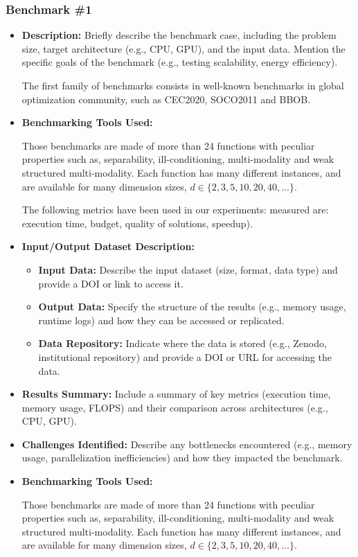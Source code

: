 \subsubsection{Benchmark \#1}
\begin{itemize}
\item \textbf{Description:} Briefly describe the benchmark case, including the problem size, target architecture (e.g., CPU, GPU), and the input data. Mention the specific goals of the benchmark (e.g., testing scalability, energy efficiency).

The first family of benchmarks consists in well-known benchmarks in global optimization community, such as CEC2020, SOCO2011 and BBOB.

\item \textbf{Benchmarking Tools Used:} 

Those benchmarks are made of more than 24 functions with peculiar properties such as, separability, ill-conditioning, multi-modality and weak structured multi-modality. Each function has many different instances, and are available for many dimension sizes, $d \in  \{ 2,3,5,10,20,40, ... \}$. 

The following metrics have been used in our experiments:  measured are: execution time, budget, quality of solutions, speedup).

\item \textbf{Input/Output Dataset Description:}
\begin{itemize}

\item \textbf{Input Data:} Describe the input dataset (size, format, data type) and provide a DOI or link to access it.

\item \textbf{Output Data:} Specify the structure of the results (e.g., memory usage, runtime logs) and how they can be accessed or replicated.

\item \textbf{Data Repository:} Indicate where the data is stored (e.g., Zenodo, institutional repository) and provide a DOI or URL for accessing the data.
\end{itemize}

\item \textbf{Results Summary:} Include a summary of key metrics (execution time, memory usage, FLOPS) and their comparison across architectures (e.g., CPU, GPU).

\item \textbf{Challenges Identified:} Describe any bottlenecks encountered (e.g., memory usage, parallelization inefficiencies) and how they impacted the benchmark.


\item \textbf{Benchmarking Tools Used:} 

Those benchmarks are made of more than 24 functions with peculiar properties such as, separability, ill-conditioning, multi-modality and weak structured multi-modality. Each function has many different instances, and are available for many dimension sizes, $d \in  \{ 2,3,5,10,20,40, ... \}$. 
\end{itemize}

